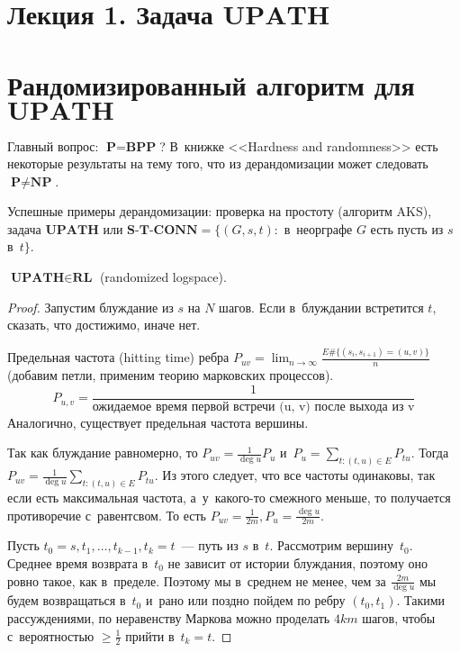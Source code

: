 \documentclass{article}
\begin{document}
\section*{Лекция 1. Задача $\textbf{UPATH}$}
\resetcntrs

\section{Рандомизированный алгоритм для $\textbf{UPATH}$}

Главный вопрос: $\textbf{P} = \textbf{BPP}$? В~книжке <<Hardness and
randomness>> есть некоторые результаты на тему того, что из дерандомизации
может следовать $\textbf{P} \ne \textbf{NP}$.

Успешные примеры дерандомизации: проверка на простоту (алгоритм AKS), задача
$\textbf{UPATH}$ или $\textbf{S-T-CONN} = \{ (G, s, t): $ в~неорграфе $G$ есть
пусть из $s$ в~$t\}$.

\begin{theorem}
	$\textbf{UPATH} \in \textbf{RL}$ (randomized logspace).
\end{theorem}
\begin{proof}
	Запустим блуждание из $s$ на $N$ шагов. Если в~блуждании встретится $t$,
	сказать, что достижимо, иначе нет.

	Предельная частота (hitting time) ребра $P_{uv} = \lim_{n \rightarrow \infty}
	\frac{E\#\{(s_i, s_{i + 1}) = (u, v) \}}{n}$ (добавим петли, применим теорию
	марковских процессов).
	$$P_{u,v} = \frac{1}{\text{ожидаемое время первой встречи (u, v) после выхода
	из v}}$$
	Аналогично, существует предельная частота вершины.

	Так как блуждание равномерно, то $P_{uv} = \frac{1}{\deg u} P_u$ и~$P_u =
	\sum\limits_{t: (t, u) \in E} P_{tu}$. Тогда $P_{uv} = \frac{1}{\deg u}
	\sum\limits_{t: (t, u) \in E} P_{tu}$. Из этого следует, что все частоты
	одинаковы, так если есть максимальная частота, а~у~какого-то смежного меньше,
	то получается противоречие с~равентсвом. То есть $P_{uv} = \frac{1}{2m}, P_u =
	\frac{\deg u}{2m}$.

	Пусть $t_0 = s, t_1, \ldots, t_{k - 1}, t_k = t$~--- путь из $s$ в~$t$.
	Рассмотрим вершину~$t_0$. Среднее время возврата в~$t_0$ не зависит от истории
	блуждания, поэтому оно ровно такое, как в~пределе. Поэтому мы в~среднем не
	менее, чем за $\frac{2m}{\deg u}$ мы будем возвращаться в~$t_0$ и~рано или
	поздно пойдем по ребру $(t_0, t_1)$. Такими рассуждениями, по неравенству
	Маркова можно проделать $4km$ шагов, чтобы с~вероятностью $\ge \frac{1}{2}$
	прийти в~$t_k = t$.
\end{proof}
\end{document}
